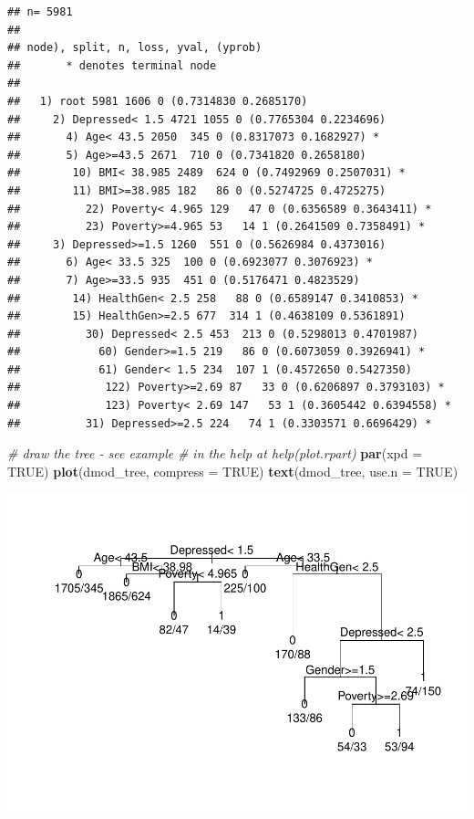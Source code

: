 \documentclass[]{article}
\newenvironment{Shaded}{\begin{snugshade}}{\end{snugshade}}
\newcommand{\KeywordTok}[1]{\textcolor[rgb]{0.13,0.29,0.53}{\textbf{{#1}}}}
\newcommand{\DataTypeTok}[1]{\textcolor[rgb]{0.13,0.29,0.53}{{#1}}}
\newcommand{\CommentTok}[1]{\textcolor[rgb]{0.56,0.35,0.01}{\textit{{#1}}}}
\newcommand{\OtherTok}[1]{\textcolor[rgb]{0.56,0.35,0.01}{{#1}}}
\newcommand{\NormalTok}[1]{{#1}}
\begin{document}
\begin{verbatim}
## n= 5981 
## 
## node), split, n, loss, yval, (yprob)
##       * denotes terminal node
## 
##   1) root 5981 1606 0 (0.7314830 0.2685170)  
##     2) Depressed< 1.5 4721 1055 0 (0.7765304 0.2234696)  
##       4) Age< 43.5 2050  345 0 (0.8317073 0.1682927) *
##       5) Age>=43.5 2671  710 0 (0.7341820 0.2658180)  
##        10) BMI< 38.985 2489  624 0 (0.7492969 0.2507031) *
##        11) BMI>=38.985 182   86 0 (0.5274725 0.4725275)  
##          22) Poverty< 4.965 129   47 0 (0.6356589 0.3643411) *
##          23) Poverty>=4.965 53   14 1 (0.2641509 0.7358491) *
##     3) Depressed>=1.5 1260  551 0 (0.5626984 0.4373016)  
##       6) Age< 33.5 325  100 0 (0.6923077 0.3076923) *
##       7) Age>=33.5 935  451 0 (0.5176471 0.4823529)  
##        14) HealthGen< 2.5 258   88 0 (0.6589147 0.3410853) *
##        15) HealthGen>=2.5 677  314 1 (0.4638109 0.5361891)  
##          30) Depressed< 2.5 453  213 0 (0.5298013 0.4701987)  
##            60) Gender>=1.5 219   86 0 (0.6073059 0.3926941) *
##            61) Gender< 1.5 234  107 1 (0.4572650 0.5427350)  
##             122) Poverty>=2.69 87   33 0 (0.6206897 0.3793103) *
##             123) Poverty< 2.69 147   53 1 (0.3605442 0.6394558) *
##          31) Depressed>=2.5 224   74 1 (0.3303571 0.6696429) *
\end{verbatim}

\begin{Shaded}
\begin{Highlighting}[]
\CommentTok{# draw the tree - see example}
\CommentTok{# in the help at help(plot.rpart)}
\KeywordTok{par}\NormalTok{(}\DataTypeTok{xpd =} \OtherTok{TRUE}\NormalTok{)}
\KeywordTok{plot}\NormalTok{(dmod_tree, }\DataTypeTok{compress =} \OtherTok{TRUE}\NormalTok{)}
\KeywordTok{text}\NormalTok{(dmod_tree, }\DataTypeTok{use.n =} \OtherTok{TRUE}\NormalTok{)}
\end{Highlighting}
\end{Shaded}

\includegraphics{Hmwk7AnswerKey_files/figure-latex/unnamed-chunk-13-1.pdf}
\end{document}
